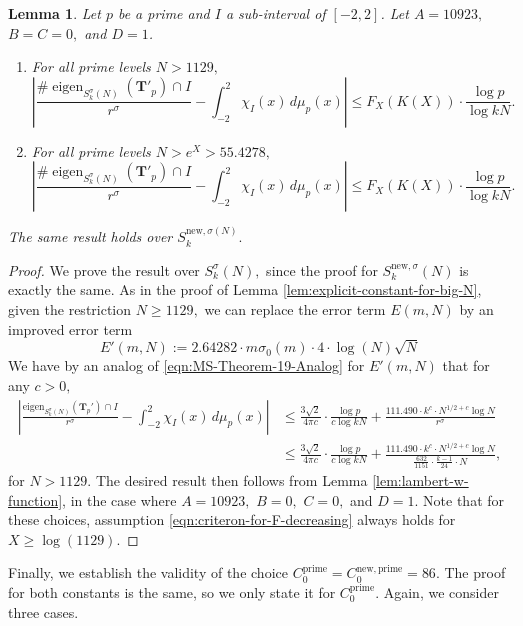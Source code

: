 \documentclass[11pt,letterpaper,reqno]{amsart}
\newtheorem{lemma}[theorem]{Lemma}
\theoremstyle{definition}
\numberwithin{equation}{section}
\numberwithin{figure}{section}
\numberwithin{table}{section}
\newcommand{\nw}{\mathrm{new}}
\begin{document}
\begin{lemma}\label{lem:explicit-constant-for-big-N-prime}
    Let $p$ be a prime and $I$ a sub-interval of $[-2, 2]$. Let $A = 10923,$ $B = C = 0,$ and $D = 1$.
    \begin{enumerate}
        \item For all prime levels $N > 1129,$
        $$\left| \frac{\# \operatorname{eigen}_{S_k^{\sigma}(N)}(\mathbf{T}'_p) \cap I}{r^\sigma} - \int_{-2}^2 \chi_I(x) \, d \mu_p(x)  \right| \leq F_{X}\!\left( K(X)  \right) \cdot \frac{\log p}{\log kN}.$$
        \item For all prime levels $N > e^X > 55.4278,$
        $$\left| \frac{\# \operatorname{eigen}_{S_k^{\sigma}(N)}(\mathbf{T}'_p) \cap I}{r^\sigma} - \int_{-2}^2 \chi_I(x) \, d \mu_p(x)  \right| \leq F_{X}\!\left( K(X)  \right) \cdot \frac{\log p}{\log kN}.$$
    \end{enumerate}
    The same result holds over $S_k^{\nw, \sigma(N)}.$ 
\end{lemma}

\begin{proof}
    We prove the result over $S_k^{\sigma}(N),$ since
    the proof for $S_k^{\nw, \sigma}(N)$ is exactly the same. As in the proof of Lemma \ref{lem:explicit-constant-for-big-N}, given the restriction $N \geq 1129,$ we can replace the error term $E(m, N)$ by an improved error term
    $$E'(m, N) := 2.64282 \cdot m \sigma_0(m) \cdot 4 \cdot \log (N) \sqrt{N}$$
    We have by an analog of \eqref{eqn:MS-Theorem-19-Analog} for $E'(m, N)$ that for any $c > 0,$
    \begin{align*}
        \left| \frac{\text{eigen}_{S_k^\sigma(N)}(\mathbf{T}_p') \cap I}{r^\sigma} - \int_{-2}^2 \chi_I(x) \, d \mu_p(x)  \right| &\leq \frac{3\sqrt{2}}{4\pi c} \cdot \frac{\log p}{c \log kN} + \frac{111.490 \cdot k^c \cdot N^{1/2 + c} \log N}{r^\sigma}\\
        &\leq \frac{3\sqrt{2}}{4\pi c} \cdot \frac{\log p}{c \log kN} + \frac{111.490 \cdot k^c \cdot N^{1/2 + c} \log N}{\frac{632}{1151} \cdot \frac{k - 1}{24} \cdot N},
    \end{align*}
    for $N > 1129.$ The desired result then follows from Lemma \ref{lem:lambert-w-function}, in the case where $A = 10923,$ $B = 0,$ $C = 0,$ and $D = 1.$ Note that for these choices, assumption \eqref{eqn:criteron-for-F-decreasing} always holds for $X \geq \log(1129).$
\end{proof}

Finally, we establish the validity of the choice $C_0^{\text{prime}} = C_0^{\nw, \text{prime}} = 86.$ The proof for both constants is the same, so we only state it for $C_0^{\text{prime}}.$ Again, we consider three cases.
\end{document}
